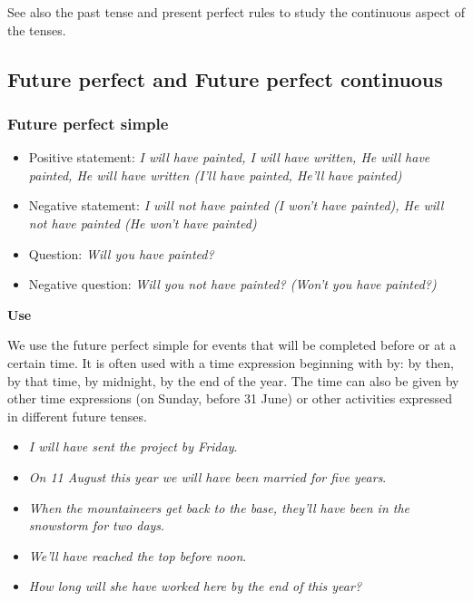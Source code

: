 See also the past tense and present perfect rules to study the continuous aspect of the tenses.

\subsection{Future perfect and Future perfect continuous}

\subsubsection{Future perfect simple}

\begin{itemize}

\item Positive statement: \textit{I will have painted, I will have written, He will have painted, He will have written (I'll have painted, He'll have painted)}
\item Negative statement: \textit{I will not have painted (I won't have painted), He will not have painted (He won't have painted)}
\item Question: \textit{Will you have painted?}
\item Negative question: \textit{Will you not have painted? (Won't you have painted?)}

\end{itemize}

\textbf{Use}

We use the future perfect simple for events that will be completed before or at a certain time. It is often used with a time expression beginning with by: by then, by that time, by midnight, by the end of the year. The time can also be given by other time expressions (on Sunday, before 31 June) or other activities expressed in different future tenses.

\begin{itemize}

\item \textit{I will have sent the project by Friday}.
\item \textit{On 11 August this year we will have been married for five years}.
\item \textit{When the mountaineers get back to the base, they'll have been in the snowstorm for two days}.
\item \textit{We'll have reached the top before noon}.
\item \textit{How long will she have worked here by the end of this year?}
\end{itemize}

